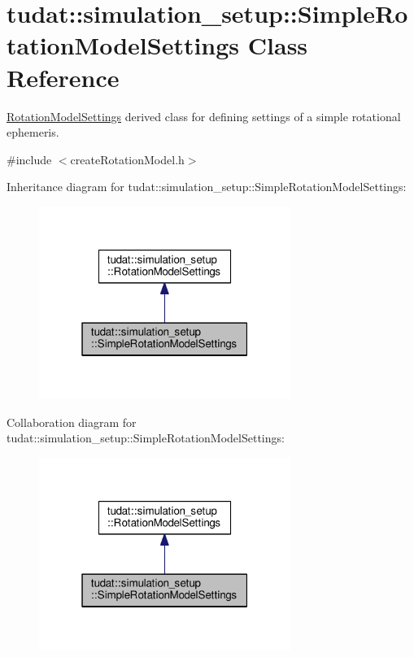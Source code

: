 \hypertarget{classtudat_1_1simulation__setup_1_1SimpleRotationModelSettings}{}\section{tudat\+:\+:simulation\+\_\+setup\+:\+:Simple\+Rotation\+Model\+Settings Class Reference}
\label{classtudat_1_1simulation__setup_1_1SimpleRotationModelSettings}


\hyperlink{classtudat_1_1simulation__setup_1_1RotationModelSettings}{Rotation\+Model\+Settings} derived class for defining settings of a simple rotational ephemeris.  




{\ttfamily \#include $<$create\+Rotation\+Model.\+h$>$}



Inheritance diagram for tudat\+:\+:simulation\+\_\+setup\+:\+:Simple\+Rotation\+Model\+Settings\+:
\nopagebreak
\begin{figure}[H]
\begin{center}
\leavevmode
\includegraphics[width=232pt]{classtudat_1_1simulation__setup_1_1SimpleRotationModelSettings__inherit__graph}
\end{center}
\end{figure}


Collaboration diagram for tudat\+:\+:simulation\+\_\+setup\+:\+:Simple\+Rotation\+Model\+Settings\+:
\nopagebreak
\begin{figure}[H]
\begin{center}
\leavevmode
\includegraphics[width=232pt]{classtudat_1_1simulation__setup_1_1SimpleRotationModelSettings__coll__graph}
\end{center}
\end{figure}
